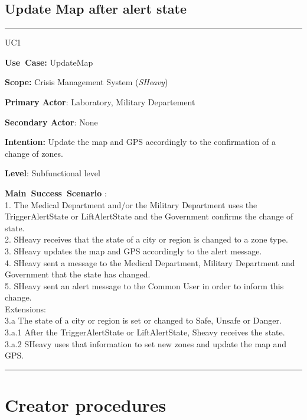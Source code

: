 \subsection{Update Map after alert state}
\vspace{0.5cm}
\hrule
\vspace{0.5cm}
\begin{lyxlist}{UC1}
\small{
\item [\textbf{Use~Case:}] UpdateMap
\item [\textbf{Scope:}] Crisis Management System (\emph{SHeavy})
\item [\textbf{Primary Actor}:] Laboratory, Military Departement
\item [\textbf{Secondary Actor}:] None
\item [\textbf{Intention:}] Update the map and GPS accordingly to 
the confirmation of a change of zones.
\item [\textbf{Level}:]Subfunctional level
\item [\textbf{Main~Success~Scenario}]:\\
1.	The Medical Department and/or the Military Department uses the TriggerAlertState
 or LiftAlertState and the Government confirms the change of state.\\
2.	SHeavy receives that the state of a city or region is changed to a zone
type.\\
3.	SHeavy updates the map and GPS accordingly to the alert message.\\
4.	SHeavy sent a message to the Medical Department, Military Department and Government 
that the state has changed.\\
5.	SHeavy sent an alert message to the Common User in order to inform this
change.\\
Extensions:\\
	3.a The state of a city or region is set or changed to Safe, Unsafe or
	Danger.\\
		3.a.1 After the TriggerAlertState or LiftAlertState, Sheavy receives the
		state.\\
		3.a.2 SHeavy uses that information to set new zones and update the map and
		GPS.\\
}
\end{lyxlist}
\hrule
\vspace{0.5cm} 


\section{Creator procedures}

